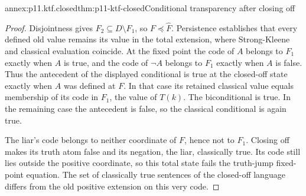 \begin{annexitem}{annex:p11.ktf.closed}{thm:p11-ktf-closed}{Conditional transparency after closing off}
\begin{proof}
Disjointness gives \(F_2\subseteq D\setminus F_1\), so
\(F\preceq\widehat F\). Persistence establishes that every
defined old value remains its value in the total extension, where
Strong-Kleene and classical evaluation coincide. At the fixed point
the code of \(A\) belongs to \(F_1\) exactly when \(A\) is
true, and the code of \(\neg A\) belongs to \(F_1\) exactly
when \(A\) is false. Thus the antecedent of the displayed conditional
is true at the closed-off state exactly when \(A\) was defined
at \(F\). In that case its retained classical value equals
membership of its code in \(F_1\), the value of \(T(k)\).
The biconditional is true. In the remaining case the antecedent is
false, so the classical conditional is again true.

The liar's code belongs to neither coordinate of \(F\), hence not
to \(F_1\). Closing off makes its truth atom false and its negation,
the liar, classically true. Its code still lies outside the positive
coordinate, so this total state fails the truth-jump fixed-point equation.
The set of classically true sentences of the closed-off language differs
from the old positive extension on this very code.
\end{proof}
\end{annexitem}

